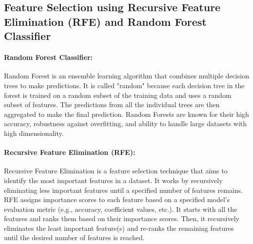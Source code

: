 \documentclass{article}
\begin{document}
\subsection{Feature Selection using Recursive Feature Elimination (RFE) and Random Forest Classifier}
\paragraph{Random Forest Classifier:}
Random Forest is an ensemble learning algorithm that combines multiple decision trees to make predictions. It is called "random" because each decision tree in the forest is trained on a random subset of the training data and uses a random subset of features. The predictions from all the individual trees are then aggregated to make the final prediction. Random Forests are known for their high accuracy, robustness against overfitting, and ability to handle large datasets with high dimensionality.

\paragraph{Recursive Feature Elimination (RFE):}
Recursive Feature Elimination is a feature selection technique that aims to identify the most important features in a dataset. It works by recursively eliminating less important features until a specified number of features remains. RFE assigns importance scores to each feature based on a specified model's evaluation metric (e.g., accuracy, coefficient values, etc.). It starts with all the features and ranks them based on their importance scores. Then, it recursively eliminates the least important feature(s) and re-ranks the remaining features until the desired number of features is reached.
\end{document}
